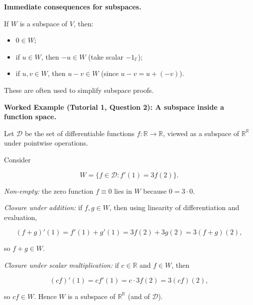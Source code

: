 \begin{keyformula}

\textbf{Immediate consequences for subspaces.}

If $W$ is a subspace of $V$, then:

\begin{itemize}[leftmargin=*]

\item $0\in W$;

\item if $u\in W$, then $-u\in W$ (take scalar $-1_{\mathbb{F}}$);

\item if $u,v\in W$, then $u-v\in W$ (since $u-v=u+(-v)$).

\end{itemize}

These are often used to simplify subspace proofs.

\end{keyformula}

\begin{examplebox}

\textbf{Worked Example (Tutorial 1, Question 2): A subspace inside a function space.}

Let $\mathcal{D}$ be the set of differentiable functions $f:\mathbb{R}\to\mathbb{R}$, viewed as a subspace of $\mathbb{R}^{\mathbb{R}}$ under pointwise operations.

Consider

\[
W=\{f\in\mathcal{D} : f'(1)=3f(2)\}.
\]

\emph{Non-empty:} the zero function $f\equiv 0$ lies in $W$ because $0=3\cdot 0$.

\emph{Closure under addition:} if $f,g\in W$, then using linearity of differentiation and evaluation,

\[
(f+g)'(1)=f'(1)+g'(1)=3f(2)+3g(2)=3(f+g)(2),
\]

so $f+g\in W$.

\emph{Closure under scalar multiplication:} if $c\in\mathbb{R}$ and $f\in W$, then

\[
(cf)'(1)=c f'(1)=c\cdot 3 f(2)=3(cf)(2),
\]

so $cf\in W$. Hence $W$ is a subspace of $\mathbb{R}^{\mathbb{R}}$ (and of $\mathcal{D}$).

\end{examplebox}

